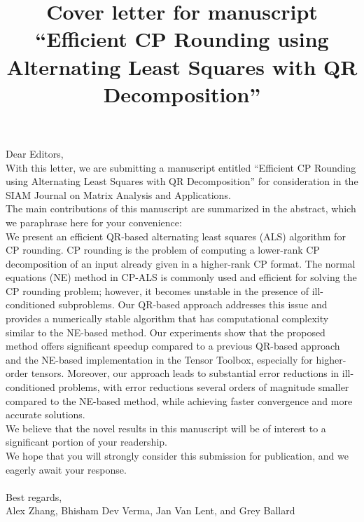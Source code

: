 \documentclass[11pt]{article}
\title{Cover letter for manuscript \\
“Efficient  CP Rounding  using  Alternating  Least Squares with QR Decomposition”
}
\author{}
\date{}
\begin{document}
\maketitle
Dear Editors,\\

With this letter, we are submitting a manuscript entitled “Efficient  CP Rounding using  Alternating  Least Squares with QR Decomposition” for consideration in the SIAM Journal on Matrix Analysis and Applications.\\


The main contributions of this manuscript are summarized in the abstract, which we paraphrase here for your convenience:\\

We present an efficient QR-based alternating least squares (ALS) algorithm for CP rounding. CP rounding is the problem of computing a lower-rank CP decomposition of an input already given in a higher-rank CP format.  The normal equations (NE) method in CP-ALS is commonly used and efficient for solving the CP rounding problem; however, it becomes unstable in the presence of ill-conditioned subproblems. Our QR-based approach addresses this issue and provides a numerically stable algorithm that has computational complexity similar to the NE-based method. Our experiments show that the proposed method offers significant speedup compared to a previous QR-based approach and the NE-based implementation in the Tensor Toolbox, especially for higher-order tensors. Moreover, our approach leads to substantial error reductions in ill-conditioned problems, with error reductions several orders of magnitude smaller compared to the NE-based method, while achieving faster convergence and more accurate solutions.\\

We believe that the novel results in this manuscript will be of interest to a significant portion of your readership.\\

We hope that you will strongly consider this submission for publication, and we eagerly await your response.\\
~\\

Best regards,\\
Alex Zhang, Bhisham Dev Verma, Jan Van Lent, and Grey Ballard
\end{document}
